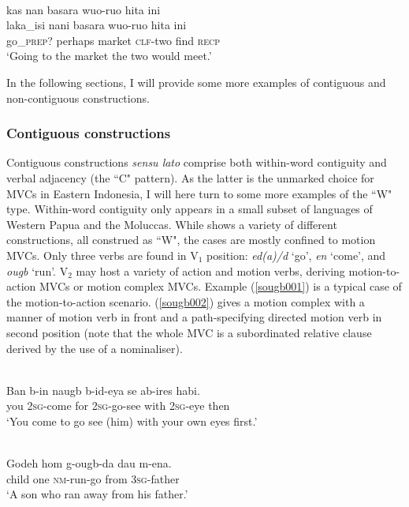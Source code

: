 \ea \label{waimaqa004}
\\
\glll kas nan basara wuo-ruo hita ini \\ 
laka\_isi nani basara wuo-ruo hita ini \\
go\_\textsc{prep?} perhaps market \textsc{clf}-two find \textsc{recp} \\
\glft `Going to the market the two would meet.'\\ 
\z

In the following sections, I will provide some more examples of contiguous and non-contiguous constructions. 

\subsubsection{Contiguous constructions}

Contiguous constructions \textit{sensu lato} comprise both within-word contiguity and verbal adjacency (the ``C" pattern). As the latter is the unmarked choice for MVCs in Eastern Indonesia, I will here turn to some more examples of the ``W" type. Within-word contiguity only appears in a small subset of languages of Western Papua and the Moluccas. While  shows a variety of different constructions, all construed as ``W", the  cases are mostly confined to motion MVCs. Only three verbs are found in V$_1$ position: \textit{ed(a)/d} `go', \textit{en} `come', and \textit{ougb} `run'. V$_2$ may host a variety of action and motion verbs, deriving motion-to-action MVCs or motion complex MVCs. Example (\ref{sougb001}) is a typical case of the motion-to-action scenario. (\ref{sougb002}) gives a motion complex with a manner of motion verb in front and a path-specifying directed motion verb in second position (note that the whole MVC is a subordinated relative clause derived by the use of a nominaliser).

\ea \label{sougb001}
\\
\gll Ban b-in naugb b-id-eya se ab-ires habi. \\
you 2\textsc{sg}-come for 2\textsc{sg}-go-see with 2\textsc{sg}-eye then \\
\glft `You come to go see (him) with your own eyes first.'\\ 
\z

\ea \label{sougb002}
\\
\gll Godeh hom g-ougb-da dau m-ena. \\
child one \textsc{nm}-run-go from 3\textsc{sg}-father \\
\glft `A son who ran away from his father.'\\ 
\z

